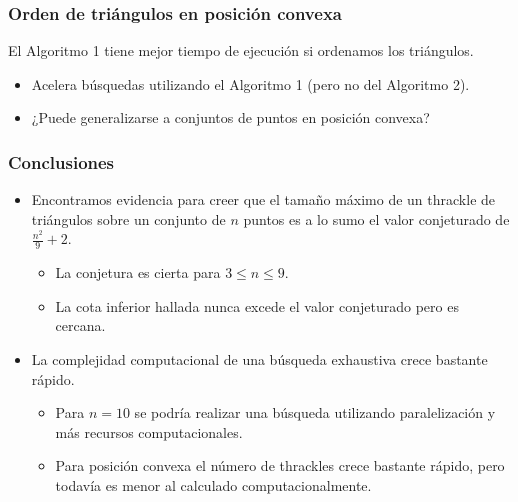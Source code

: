 \documentclass{beamer}
\begin{document}
\begin{frame}
  \frametitle{Orden de triángulos en posición convexa}
  El Algoritmo 1 tiene mejor tiempo de ejecución si ordenamos los triángulos.
  \begin{overprint}
    \begin{figure}[htb]
      \centering
      
    \end{figure}
    \begin{figure}[htb]
      \centering
      
    \end{figure}
    \begin{figure}[htb]
      \centering
      
    \end{figure}
    \begin{itemize}
      \item Acelera búsquedas utilizando el Algoritmo 1 (pero no del Algoritmo 2).
      \item ¿Puede generalizarse a conjuntos de puntos en posición convexa?
    \end{itemize}
  \end{overprint}
\end{frame}

\begin{frame}
  \frametitle{Conclusiones}
  \begin{itemize}
    \item Encontramos evidencia para creer que el tamaño máximo de un thrackle
      de triángulos sobre un conjunto de $n$ puntos es a lo sumo el valor
      conjeturado de $\frac{n^2}{9}+2$.
      \begin{itemize}
          \item La conjetura es cierta para $3\le n\le 9$.
          \item La cota inferior hallada nunca excede el valor conjeturado pero
            es cercana.
      \end{itemize}
    \item La complejidad computacional de una búsqueda exhaustiva crece bastante
      rápido.
      \begin{itemize}
          \item Para $n=10$ se podría realizar una búsqueda utilizando
            paralelización y más recursos computacionales.
          \item Para posición convexa el número de thrackles crece bastante
            rápido, pero todavía es menor al calculado computacionalmente.
      \end{itemize}
  \end{itemize}
\end{frame}
\end{document}
